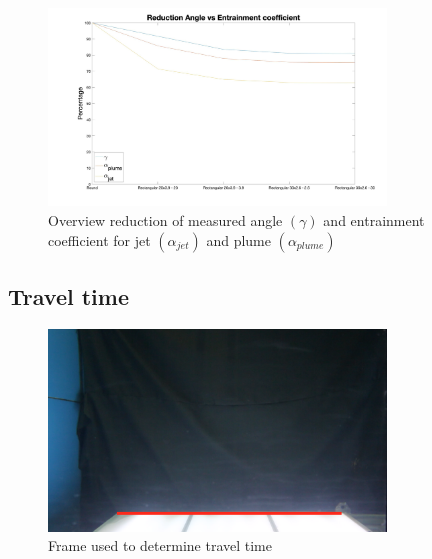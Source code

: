 \begin{figure}
    \centering
    \includegraphics[width = 0.8\textwidth] {Images/Reduction_graph.jpg}
    \caption{Overview reduction of measured angle $(\gamma)$ and entrainment coefficient for jet $(\alpha_{jet})$ and plume $(\alpha_{plume})$}
    \label{fig:overview_angle_entrainment}
\end{figure}






\newpage
\subsection{Travel time}


\begin{figure}[ht!]
    \centering
    \includegraphics[width=0.8\textwidth]{Images/Traveltime_frame.png}
    \caption{Frame used to determine travel time}
    \label{fig:traveltime_frame}
\end{figure}






